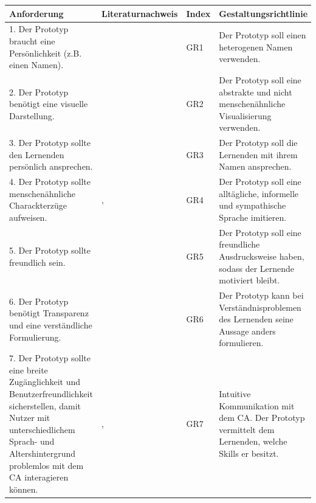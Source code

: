 \begingroup
  \footnotesize                      
  \setlongtables
  \useunder{\uline}{\ul}{}
  \begin{longtable}{|m{4.75cm}|m{3.5cm}|m{1cm}|m{4.75cm}|}
  \hline     
  \rowcolor[HTML]{EFEFEF}  
  
  \centering \textbf{Anforderung} & \centering \textbf{Literaturnachweis} & \centering \textbf{Index} & \centering \arraybackslash \textbf{Gestaltungsrichtlinie}\\ 
  \hline  \hline 

1. Der Prototyp braucht eine Persönlichkeit (z.B. einen Namen). & \parencite[158]{Silvervarg.2012}&GR1& Der Prototyp soll einen heterogenen Namen verwenden.\\ \hline

  2. Der Prototyp benötigt eine visuelle Darstellung. & \parencite[71]{Pearl.2016} &GR2& Der Prototyp soll eine abstrakte und nicht menschenähnliche Visualisierung verwenden. \\ \hline
 
  3. Der Prototyp sollte den Lernenden persönlich ansprechen. & \parencite[60]{Liebrecht.2020} &GR3 & Der Prototyp soll die Lernenden mit ihrem Namen ansprechen.\\ \hline

  4. Der Prototyp sollte menschenähnliche Charackterzüge aufweisen. & \parencite[60]{Liebrecht.2020}, \parencite[9]{Jain.2018} &GR4 & Der Prototyp soll eine alltägliche, informelle und sympathische Sprache imitieren.\\ \hline

  5. Der Prototyp sollte freundlich sein. &\parencite[7]{Wambsganß.2020} &GR5& Der Prototyp soll eine freundliche Ausdrucksweise haben, sodass der Lernende motiviert bleibt. \\ \hline

  6. Der Prototyp benötigt Transparenz und eine verständliche Formulierung. & \parencite[10 f.]{Wambsganß.2021} &GR6& Der Prototyp kann bei Verständnisproblemen des Lernenden seine Aussage anders formulieren. \\ \hline

 7. Der Prototyp sollte eine breite Zugänglichkeit und Benutzerfreundlichkeit sicherstellen, damit Nutzer mit unterschiedlichem Sprach- und Altershintergrund problemlos mit dem CA interagieren können.& \parencite[10 f.]{Wambsganß.2021}, \parencite[9]{Jain.2018} &GR7&Intuitive Kommunikation mit dem CA. Der Prototyp vermittelt dem Lernenden, welche Skills er besitzt.\\ \hline


\end{longtable}
